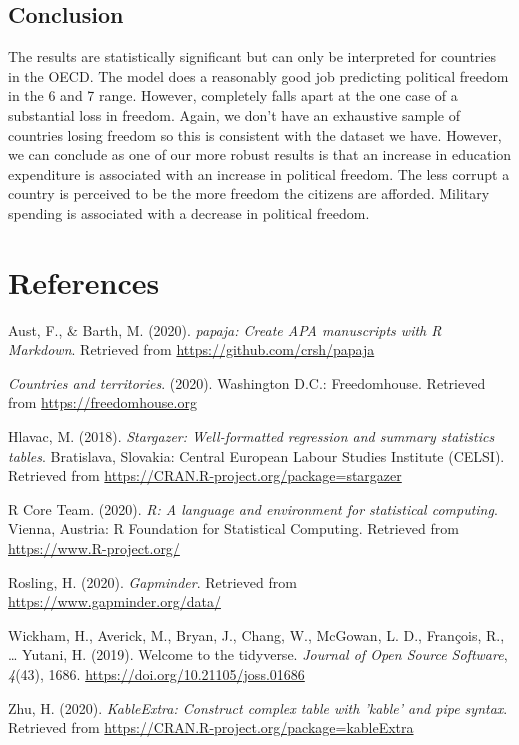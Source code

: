 \documentclass[
  english,
  man,floatsintext]{apa6}
\newlength{\cslhangindent}
\newenvironment{cslreferences}%
  {\setlength{\parindent}{0pt}%
  \everypar{\setlength{\hangindent}{\cslhangindent}}\ignorespaces}%
  {\par}
\begin{document}
\hypertarget{conclusion}{%
\subsection{Conclusion}\label{conclusion}}

The results are statistically significant but can only be interpreted for countries in the OECD. The model does a reasonably good job predicting political freedom in the 6 and 7 range. However, completely falls apart at the one case of a substantial loss in freedom. Again, we don't have an exhaustive sample of countries losing freedom so this is consistent with the dataset we have. However, we can conclude as one of our more robust results is that an increase in education expenditure is associated with an increase in political freedom. The less corrupt a country is perceived to be the more freedom the citizens are afforded. Military spending is associated with a decrease in political freedom.

\newpage

\hypertarget{references}{%
\section{References}\label{references}}

\begingroup
\setlength{\parindent}{-0.5in}
\setlength{\leftskip}{0.5in}

\hypertarget{refs}{}
\begin{cslreferences}
\leavevmode\hypertarget{ref-R-papaja}{}%
Aust, F., \& Barth, M. (2020). \emph{papaja: Create APA manuscripts with R Markdown}. Retrieved from \url{https://github.com/crsh/papaja}

\leavevmode\hypertarget{ref-Freedomhouse}{}%
\emph{Countries and territories}. (2020). Washington D.C.: Freedomhouse. Retrieved from \url{https://freedomhouse.org}

\leavevmode\hypertarget{ref-R-stargazer}{}%
Hlavac, M. (2018). \emph{Stargazer: Well-formatted regression and summary statistics tables}. Bratislava, Slovakia: Central European Labour Studies Institute (CELSI). Retrieved from \url{https://CRAN.R-project.org/package=stargazer}

\leavevmode\hypertarget{ref-R-base}{}%
R Core Team. (2020). \emph{R: A language and environment for statistical computing}. Vienna, Austria: R Foundation for Statistical Computing. Retrieved from \url{https://www.R-project.org/}

\leavevmode\hypertarget{ref-Gapminder}{}%
Rosling, H. (2020). \emph{Gapminder}. Retrieved from \url{https://www.gapminder.org/data/}

\leavevmode\hypertarget{ref-R-tidyverse}{}%
Wickham, H., Averick, M., Bryan, J., Chang, W., McGowan, L. D., François, R., \ldots{} Yutani, H. (2019). Welcome to the tidyverse. \emph{Journal of Open Source Software}, \emph{4}(43), 1686. \url{https://doi.org/10.21105/joss.01686}

\leavevmode\hypertarget{ref-R-kableExtra}{}%
Zhu, H. (2020). \emph{KableExtra: Construct complex table with 'kable' and pipe syntax}. Retrieved from \url{https://CRAN.R-project.org/package=kableExtra}
\end{cslreferences}
\end{document}
